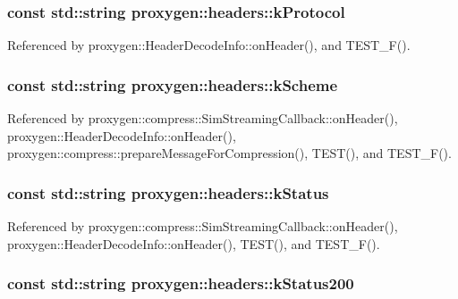 \subsubsection[{k\+Protocol}]{\setlength{\rightskip}{0pt plus 5cm}const std\+::string proxygen\+::headers\+::k\+Protocol}\label{namespaceproxygen_1_1headers_a9978350c52c030ec0c9b6e0fb9cb6263}


Referenced by proxygen\+::\+Header\+Decode\+Info\+::on\+Header(), and T\+E\+S\+T\+\_\+\+F().

\subsubsection[{k\+Scheme}]{\setlength{\rightskip}{0pt plus 5cm}const std\+::string proxygen\+::headers\+::k\+Scheme}\label{namespaceproxygen_1_1headers_aae186a9f9432c49ba9fb586eeb616412}


Referenced by proxygen\+::compress\+::\+Sim\+Streaming\+Callback\+::on\+Header(), proxygen\+::\+Header\+Decode\+Info\+::on\+Header(), proxygen\+::compress\+::prepare\+Message\+For\+Compression(), T\+E\+S\+T(), and T\+E\+S\+T\+\_\+\+F().

\subsubsection[{k\+Status}]{\setlength{\rightskip}{0pt plus 5cm}const std\+::string proxygen\+::headers\+::k\+Status}\label{namespaceproxygen_1_1headers_a0d60880227f5c1275d02bfdbc4a6ed4b}


Referenced by proxygen\+::compress\+::\+Sim\+Streaming\+Callback\+::on\+Header(), proxygen\+::\+Header\+Decode\+Info\+::on\+Header(), T\+E\+S\+T(), and T\+E\+S\+T\+\_\+\+F().

\subsubsection[{k\+Status200}]{\setlength{\rightskip}{0pt plus 5cm}const std\+::string proxygen\+::headers\+::k\+Status200}\label{namespaceproxygen_1_1headers_afcc175a6366bc1231b26a443495d07a6}



